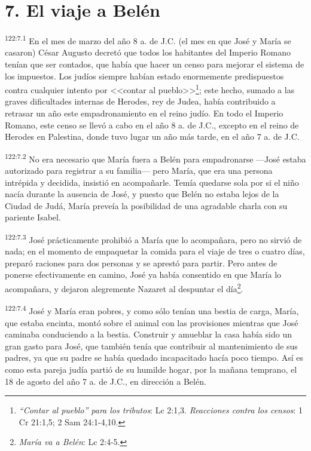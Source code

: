 \section*{7. El viaje a Belén}
\par 
\textsuperscript{122:7.1} En el mes de marzo del año 8 a. de J.C. (el mes en que José y María se casaron) César Augusto decretó que todos los habitantes del Imperio Romano tenían que ser contados, que había que hacer un censo para mejorar el sistema de los impuestos. Los judíos siempre habían estado enormemente predispuestos contra cualquier intento por <<contar al pueblo>>\footnote{\textit{``Contar al pueblo'' para los tributos}: Lc 2:1,3. \textit{Reacciones contra los censos}: 1 Cr 21:1,5; 2 Sam 24:1-4,10.}; este hecho, sumado a las graves dificultades internas de Herodes, rey de Judea, había contribuido a retrasar un año este empadronamiento en el reino judío. En todo el Imperio Romano, este censo se llevó a cabo en el año 8 a. de J.C., excepto en el reino de Herodes en Palestina, donde tuvo lugar un año más tarde, en el año 7 a. de J.C.

\par 
\textsuperscript{122:7.2} No era necesario que María fuera a Belén para empadronarse ---José estaba autorizado para registrar a su familia--- pero María, que era una persona intrépida y decidida, insistió en acompañarle. Temía quedarse sola por si el niño nacía durante la ausencia de José, y puesto que Belén no estaba lejos de la Ciudad de Judá, María preveía la posibilidad de una agradable charla con su pariente Isabel.

\par 
\textsuperscript{122:7.3} José prácticamente prohibió a María que lo acompañara, pero no sirvió de nada; en el momento de empaquetar la comida para el viaje de tres o cuatro días, preparó raciones para dos personas y se aprestó para partir. Pero antes de ponerse efectivamente en camino, José ya había consentido en que María lo acompañara, y dejaron alegremente Nazaret al despuntar el día\footnote{\textit{María va a Belén}: Lc 2:4-5.}.

\par 
\textsuperscript{122:7.4} José y María eran pobres, y como sólo tenían una bestia de carga, María, que estaba encinta, montó sobre el animal con las provisiones mientras que José caminaba conduciendo a la bestia. Construir y amueblar la casa había sido un gran gasto para José, que también tenía que contribuir al mantenimiento de sus padres, ya que su padre se había quedado incapacitado hacía poco tiempo. Así es como esta pareja judía partió de su humilde hogar, por la mañana temprano, el 18 de agosto del año 7 a. de J.C., en dirección a Belén.


